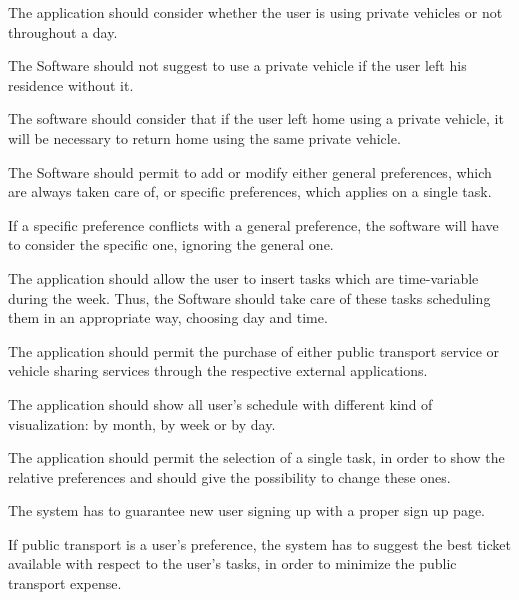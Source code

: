 \begin{requirementList}
    \item The application should consider whether the user is using private vehicles or not throughout a day.
    \begin{enumerate}[label={[}R 10.\arabic*{]}:]
    \item The Software should not suggest to use a private vehicle if the user left his residence without it.
   
    \item The software should consider that if the user left home using a private vehicle, it will be necessary to return home using the same private vehicle.
    \end{enumerate}
    
    \item The Software should permit to add or modify either general preferences, which are always taken care of, or specific preferences, which applies on a single task.
    \begin{enumerate}[label={[}R 11.\arabic*{]}:]
    \item If a specific preference conflicts with a general preference, the software will have to consider the specific one, ignoring the general one.
    \end{enumerate}
    
    \item The application should allow the user to insert tasks which are time-variable during the week. Thus, the Software should take care of these tasks scheduling them in an appropriate way, choosing day and time.
    
    \item The application should permit the purchase of either public transport service or vehicle sharing services through the respective external applications.
    
    \item The application should show all user's schedule with different kind of visualization: by month, by week or by day.
    
    \item The application should permit the selection of a single task, in order to show the relative preferences and should give the possibility to change these ones.
    
    \item The system has to guarantee new user signing up with a proper sign up page. 
    \item If public transport is a user's preference, the system has to suggest the best ticket available with respect to the user's tasks, in order to minimize the public transport expense.
\end{requirementList}

